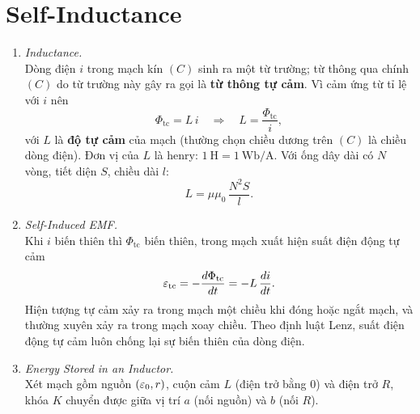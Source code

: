 \section{Self-Inductance}
\begin{enumerate}
\item \textit{Inductance.}\\
Dòng điện $i$ trong mạch kín $(C)$ sinh ra một từ trường; từ thông qua chính $(C)$ do từ trường này gây ra gọi là \textbf{từ thông tự cảm}. Vì cảm ứng từ tỉ lệ với $i$ nên
\[
\Phi_{\text{tc}} = L\,i
\quad\Rightarrow\quad
L = \frac{\Phi_{\text{tc}}}{i},
\]
với $L$ là \textbf{độ tự cảm} của mạch (thường chọn chiều dương trên $(C)$ là chiều dòng điện). Đơn vị của $L$ là henry: $1\ \text{H} = 1\ \text{Wb/A}$. Với ống dây dài có $N$ vòng, tiết diện $S$, chiều dài $l$:
\[
L = \mu\mu_0\,\frac{N^2 S}{l}.
\]

\item \textit{Self-Induced EMF.}\\
Khi $i$ biến thiên thì $\Phi_{\text{tc}}$ biến thiên, trong mạch xuất hiện suất điện động tự cảm
\[
\varepsilon_{\text{tc}} = -\frac{d\Phi_{\text{tc}}}{dt} = -L\,\frac{di}{dt}.
\]
Hiện tượng tự cảm xảy ra trong mạch một chiều khi đóng hoặc ngắt mạch, và thường xuyên xảy ra trong mạch xoay chiều. Theo định luật Lenz, suất điện động tự cảm luôn chống lại sự biến thiên của dòng điện.

\item \textit{Energy Stored in an Inductor.}\\
Xét mạch gồm nguồn $(\varepsilon_0, r)$, cuộn cảm $L$ (điện trở bằng 0) và điện trở $R$, khóa $K$ chuyển được giữa vị trí $a$ (nối nguồn) và $b$ (nối $R$).
\begin{figure}[htbp]
    \centering
\end{figure}


\end{enumerate}
